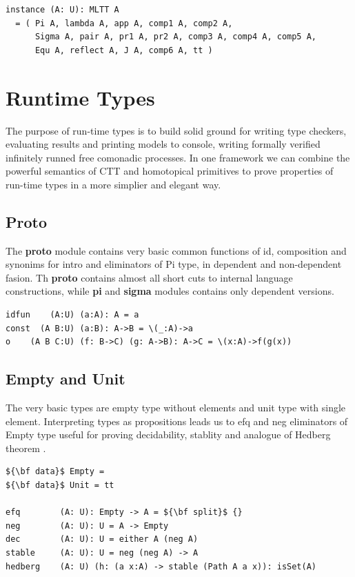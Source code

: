 \documentclass{article}
\begin{document}
\begin{lstlisting}[mathescape=true]
instance (A: U): MLTT A
  = ( Pi A, lambda A, app A, comp1 A, comp2 A,
      Sigma A, pair A, pr1 A, pr2 A, comp3 A, comp4 A, comp5 A,
      Equ A, reflect A, J A, comp6 A, tt )
\end{lstlisting}

\section{Runtime Types}

The purpose of run-time types is to build solid ground for
writing type checkers, evaluating results and printing models to console,
writing formally verified infinitely runned free comonadic processes.
In one framework we can combine the powerful semantics of CTT and
homotopical primitives to prove properties of run-time types in
a more simplier and elegant way.

\subsection{Proto}

The {\bf proto} module contains very basic common functions of id, composition and
synonims for intro and eliminators of Pi type, in dependent and non-dependent fasion.
Th {\bf proto} contains almost all short cuts to internal language constructions,
while {\bf pi} and {\bf sigma} modules contains only dependent versions.

\begin{lstlisting}[mathescape=true]
idfun    (A:U) (a:A): A = a
const  (A B:U) (a:B): A->B = \(_:A)->a
o    (A B C:U) (f: B->C) (g: A->B): A->C = \(x:A)->f(g(x))
\end{lstlisting}

\subsection{Empty and Unit}

The very basic types are empty type without elements and unit type with single element.
Interpreting types as propositions leads us to efq and neg eliminators of Empty type useful
for proving decidability, stablity and analogue of Hedberg theorem \cite{Hedberg98}.

\begin{lstlisting}[mathescape=true]
${\bf data}$ Empty =
${\bf data}$ Unit = tt

efq        (A: U): Empty -> A = ${\bf split}$ {}
neg        (A: U): U = A -> Empty
dec        (A: U): U = either A (neg A)
stable     (A: U): U = neg (neg A) -> A
hedberg    (A: U) (h: (a x:A) -> stable (Path A a x)): isSet(A)
\end{lstlisting}
\end{document}
